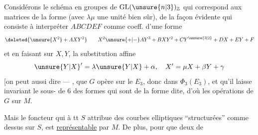 

 Considérons le schéma en groupes de $\operatorname{GL}(\unsure{n|3})_{\mathbb Z}$ qui correspond aux matrices de la forme
(avec $\lambda\mu$ une unité bien sûr),  de la façon évidente qui consiste à interpréter $ABCDEF$ comme coeff. d'une forme
\[
\deleted{\unsure{X^2}+AXY^2}\qquad X^2\unsure{+|-}AY^3+BXY^2+CY^{\unsure{3|2}}+DX+EY+F
\]
et en faisant sur $X,Y$, la substitution affine
\[
\unsure{Y|X}'=\lambda\unsure{Y|X}+\alpha,\quad X'=\mu X+\beta Y+\gamma
\]
[on peut aussi dire --- , que $G$ opère sur le  $E_3$, donc dans $\Phi_3(E_3)$, et qu'il laisse invariant le sous- de  $6$ des formes qui sont de la forme dite, d'où les opérations de $G$ sur $M$.

Mais le foncteur qui à tt $S$ attribue   des courbes elliptiques ``structurées'' comme dessus sur $S$, est \uline{représentable} par $M$. De plus, pour que deux  de
